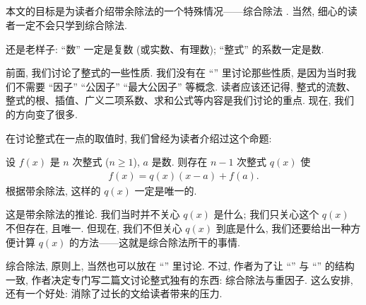 \subsection*{\SyntheticDivision}
\markright{\SyntheticDivision}

本文的目标是为读者介绍带余除法的一个特殊情况——综合除法 . 当然, 细心的读者一定不会只学到综合除法.

还是老样子: ``数'' 一定是复数 (或实数、有理数); ``整式'' 的系数一定是数.

前面, 我们讨论了整式的一些性质. 我们没有在 ``\HEADING'' 里讨论那些性质, 是因为当时我们不需要 ``因子'' ``公因子'' ``最大公因子'' 等概念. 读者应该还记得, 整式的流数、整式的根、插值、广义二项系数、求和公式等内容是我们讨论的重点. 现在, 我们的方向变了很多.

在讨论整式在一点的取值时, 我们曾经为读者介绍过这个命题:
\begin{proposition}
    设 $f(x)$ 是 $n$ 次整式 ($n \geq 1$), $a$ 是数. 则存在 $n-1$ 次整式 $q(x)$ 使
    \begin{align*}
        f(x) = q(x) (x-a) + f(a).
    \end{align*}
    根据带余除法, 这样的 $q(x)$ 一定是唯一的.
\end{proposition}

这是带余除法的推论. 我们当时并不关心 $q(x)$ 是什么; 我们只关心这个 $q(x)$ 不但存在, 且唯一. 但现在, 我们不但关心 $q(x)$ 到底是什么, 我们还要给出一种方便计算 $q(x)$ 的方法——这就是综合除法所干的事情.

综合除法, 原则上, 当然也可以放在 ``\SomePropertiesOfPolynomials'' 里讨论. 不过, 作者为了让 ``\SomePropertiesOfIntegers'' 与 ``\SomePropertiesOfPolynomials'' 的结构一致, 作者决定专门写二篇文讨论整式独有的东西: 综合除法与重因子. 这么安排, 还有一个好处: 消除了过长的文给读者带来的压力.

